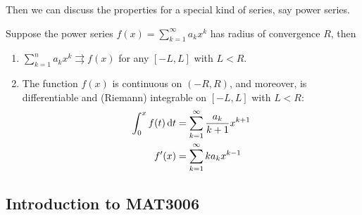Then we can discuss the properties for a special kind of series, say power series.
\begin{proposition}
Suppose the power series $f(x)=\sum_{k=1}^\infty a_kx^k$ has radius of convergence $R$, then 
\begin{enumerate}
\item
$
\sum_{k=1}^na_kx^k\rightrightarrows f(x)
$
for any $[-L,L]$ with $L<R$.
\item
The function $f(x)$ is continuous on $(-R,R)$, and moreover, is differentiable and (Riemann) integrable on $[-L,L]$ with $L<R$:
\begin{align*}
\int_0^xf(t)\,\mathrm{d} t&=\sum_{k=1}^\infty\frac{a_k}{k+1}x^{k+1}\\
f'(x)&=\sum_{k=1}^\infty ka_kx^{k-1}
\end{align*}
\end{enumerate}
\end{proposition}
\subsection{Introduction to MAT3006}
